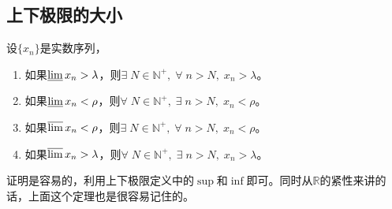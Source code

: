 \subsection{上下极限的大小}
\begin{theorem}
	设$\{x_n\}$是实数序列，
	\begin{enumerate}
		\item 如果$\varliminf x_n>\lambda$，则$\exists\;N\in\mathbb{N}^+,\;\forall\;n>N,\;x_n>\lambda$。
		\item 如果$\varliminf x_n<\rho$，则$\forall\;N\in\mathbb{N}^+,\;\exists\;n>N,\;x_n<\rho$。
		\item 如果$\varlimsup x_n<\rho$，则$\exists\;N\in\mathbb{N}^+,\;\forall\;n>N,\;x_n<\rho$。
		\item 如果$\varlimsup x_n>\lambda$，则$\forall\;N\in\mathbb{N}^+,\;\exists\;n>N,\;x_n>\lambda$。
	\end{enumerate}
\end{theorem}
证明是容易的，利用上下极限定义中的$\sup$和$\inf$即可。同时从$\mathbb{R}$的紧性来讲的话，上面这个定理也是很容易记住的。

